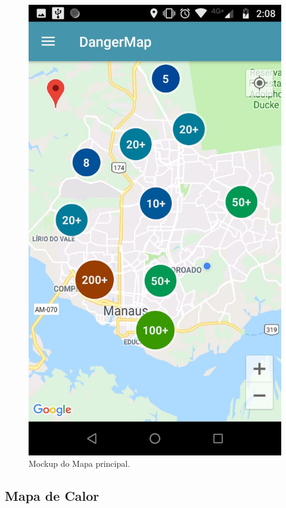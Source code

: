 \documentclass[
	12pt,				%
	openright,			%
	twoside,			%
	a4paper,			%
	english,			%
	french,				%
	spanish,			%
	brazil,				%
	]{abntex2}
\begin{document}
\begin{figure}[h]
	\caption{\label{tela_principal}Mockup do Mapa principal.}
	\begin{center}
		\includegraphics[scale=0.2]{figuras/tela-clustermap.jpeg}
	\end{center}
\end{figure}

\subsection{Mapa de Calor}
\end{document}
